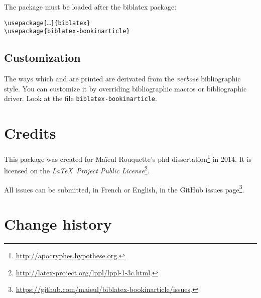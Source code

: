 \documentclass{ltxdockit}[2011/03/25]
\newcommand{\biblatex}{biblatex\xspace}
\begin{document}
The package must be loaded after the \biblatex package:
\begin{verbatim}
\usepackage[…]{biblatex}
\usepackage{biblatex-bookinarticle}
\end{verbatim}

\subsection{Customization}

The ways which  and  are printed are derivated from the \emph{verbose} bibliographic style. You can customize it by overriding bibliographic macros or bibliographic driver. Look at the file \verb+biblatex-bookinarticle+.

\section{Credits}

This package was created for Maïeul Rouquette's phd dissertation\footnote{\url{http://apocryphes.hypothese.org}.} in 2014. It is licensed on the \emph{\LaTeX\ Project Public License}\footnote{\url{http://latex-project.org/lppl/lppl-1-3c.html}.}. 


All issues can be submitted, in French or English, in the GitHub issues page\footnote{\url{https://github.com/maieul/biblatex-bookinarticle/issues}.}.


\section{Change history}
\end{document}

